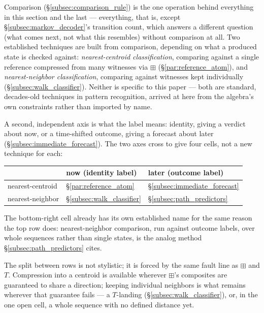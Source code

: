 \documentclass[12pt, a4paper]{article}
\begin{document}
Comparison (\S\ref{subsec:comparison_rule}) is the one operation
behind everything in this section and the last --- everything, that
is, except \S\ref{subsec:markov_decoder}'s transition count, which
answers a different question (what comes next, not what this
resembles) without comparison at all. Two established
techniques are built from comparison, depending on what a produced
state is checked against: \emph{nearest-centroid classification},
comparing against a single reference compressed from many witnesses
via $\boxplus$ (\S\ref{par:reference_atom}), and
\emph{nearest-neighbor classification}, comparing against witnesses
kept individually (\S\ref{subsec:walk_classifier}). Neither is
specific to this paper --- both are standard, decades-old techniques
in pattern recognition, arrived at here from the algebra's own
constraints rather than imported by name.

A second, independent axis is what the label means: identity, giving
a verdict about now, or a time-shifted outcome, giving a forecast
about later (\S\ref{subsec:immediate_forecast}). The two axes cross
to give four cells, not a new technique for each:

\begin{center}
\begin{tabular}{lll}
\hline
 & now (identity label) & later (outcome label) \\
\hline
nearest-centroid &
  \S\ref{par:reference_atom} &
  \S\ref{subsec:immediate_forecast} \\
nearest-neighbor &
  \S\ref{subsec:walk_classifier} &
  \S\ref{subsec:path_predictors} \\
\hline
\end{tabular}
\end{center}

The bottom-right cell already has its own established name for the
same reason the top row does: nearest-neighbor comparison, run
against outcome labels, over whole sequences rather than single
states, is the analog method \S\ref{subsec:path_predictors} cites.

The split between rows is not stylistic; it is forced by the same
fault line as $\boxplus$ and $T$. Compression into a centroid is
available wherever $\boxplus$'s composites are guaranteed to share a
direction; keeping individual neighbors is what remains wherever that
guarantee fails --- a $T$-landing (\S\ref{subsec:walk_classifier}),
or, in the one open cell, a whole sequence with no defined distance
yet.
\end{document}
